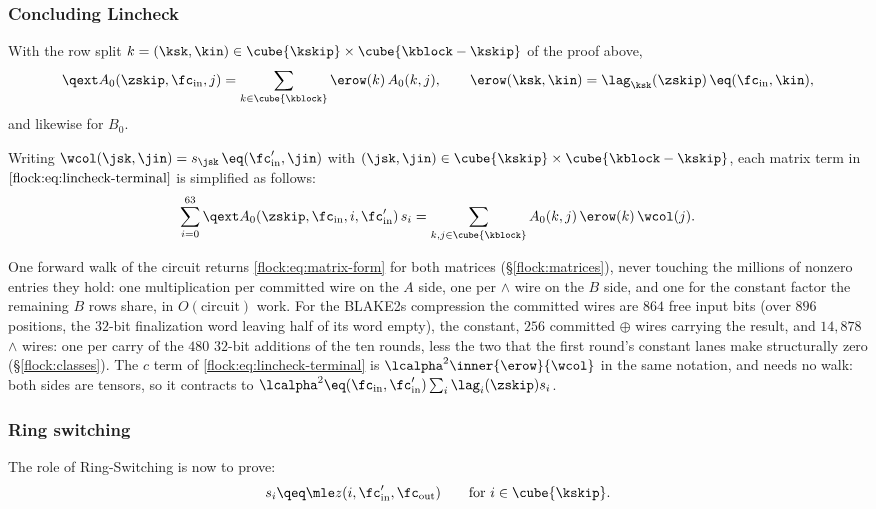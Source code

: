 \subsubsection{Concluding Lincheck}\label{flock:native}


With the row split $k=(\ksk,\kin) \in\cube{\kskip} \times \cube{\kblock-\kskip}$ of the proof above,
\begin{equation}\label{flock:eq:erow}
\qext A_0(\zskip,\fc_{\mathrm{in}},j)=\sum_{k\in\cube{\kblock}}\erow(k)\,A_0(k,j),\qquad
\erow(\ksk,\kin)=\lag_{\ksk}(\zskip)\,\eq(\fc_{\mathrm{in}},\kin),
\end{equation}
and likewise for $B_0$.

Writing $\wcol(\jsk,\jin)=s_{\jsk}\,\eq(\fc'_{\mathrm{in}},\jin)$ with $(\jsk,\jin) \in\cube{\kskip} \times \cube{\kblock-\kskip}$, each matrix term in $\eqref{flock:eq:lincheck-terminal}$ is simplified as follows:
\begin{equation}\label{flock:eq:matrix-form}
\sum_{i=0}^{63}\qext A_0(\zskip,\fc_{\mathrm{in}},i,\fc'_{\mathrm{in}})\,s_i=\sum_{k,j\in\cube{\kblock}}A_0(k,j)\,\erow(k)\,\wcol(j).
\end{equation}

One forward walk of the circuit returns \eqref{flock:eq:matrix-form} for both matrices (\S\ref{flock:matrices}), never touching the millions of nonzero entries they hold: one multiplication per committed wire on the $A$ side, one per $\wedge$ wire on the $B$ side, and one for the constant factor the remaining $B$ rows share, in $O(\text{circuit})$ work. For the BLAKE2s compression the committed wires are $864$ free input bits (over $896$ positions, the $32$-bit finalization word leaving half of its word empty), the constant, $256$ committed $\oplus$ wires carrying the result, and $14{,}878$ $\wedge$ wires: one per carry of the $480$ $32$-bit additions of the ten rounds, less the two that the first round's constant lanes make structurally zero (\S\ref{flock:classes}). The $c$ term of \eqref{flock:eq:lincheck-terminal} is $\lcalpha^2\inner{\erow}{\wcol}$ in the same notation, and needs no walk: both sides are tensors, so it contracts to $\lcalpha^2\eq(\fc_{\mathrm{in}},\fc'_{\mathrm{in}})\sum_i\lag_i(\zskip)s_i$.

\subsubsection{Ring switching}\label{flock:ringswitch}

The role of Ring-Switching is now to prove:
\[
s_i \qeq \mle z(i,\fc'_{\mathrm{in}},\fc_{\mathrm{out}})\qquad\text{for }i\in\cube{\kskip}.
\]


